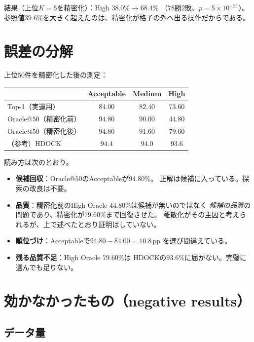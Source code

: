 \documentclass[11pt,a4paper]{article}
\begin{document}
結果（上位$K = 5$を精密化）：High $38.0\% \to 68.4\%$
（$78$勝$2$敗、$p = 5\times10^{-21}$）。
参照値$39.6\%$を大きく超えたのは、精密化が格子の外へ出る操作だからである。

\section{誤差の分解}

上位$50$件を精密化した後の測定：

\begin{center}
\begin{tabular}{lccc}
\toprule
 & Acceptable & Medium & High\\
\midrule
Top-1（実運用） & $84.00$ & $82.40$ & $73.60$\\
$\mathrm{Oracle}@50$（精密化前） & $94.80$ & $90.00$ & $44.80$\\
$\mathrm{Oracle}@50$（精密化後） & $\mathbf{94.80}$ & $91.60$ & $\mathbf{79.60}$\\
\midrule
（参考）HDOCK & $94.4$ & $94.0$ & $93.6$\\
\bottomrule
\end{tabular}
\end{center}

読み方は次のとおり。
\begin{itemize}
  \item \textbf{候補回収}：$\mathrm{Oracle}@50$のAcceptableが$94.80\%$。
        正解は候補に入っている。探索の改良は不要。
  \item \textbf{品質}：精密化前のHigh Oracle $44.80\%$は候補が無いのではなく
        \emph{候補の品質}の問題であり、精密化が$79.60\%$まで回復させた。
        離散化がその主因と考えられるが、上で述べたとおり証明はしていない。
  \item \textbf{順位づけ}：Acceptableで$94.80 - 84.00 = 10.8$\,pp を選び間違えている。
  \item \textbf{残る品質不足}：High Oracle $79.60\%$は
        HDOCKの$93.6\%$に届かない。完璧に選んでも足りない。
\end{itemize}

\section{効かなかったもの（negative results）}

\subsection{データ量}
\end{document}

